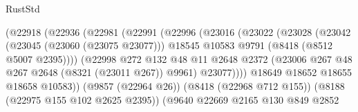 \begin{lexlean}{RustStd}
\begin{coremodule}
                                        (@22918
                                          (@22936
                                            (@22981
                                              (@22991
                                                (@22996
                                                  (@23016
                                                    (@23022
                                                      (@23028
                                                        (@23042
                                                          (@23045 (@23060 (@23075 @23077)))
                                                          @18545
                                                          @10583
                                                          @9791
                                                          (@8418 (@8512 @5007 @2395))))
                                                      (@22998
                                                        @272
                                                        @132
                                                        @48
                                                        @11
                                                        @2648
                                                        @2372
                                                        (@23006
                                                          @267
                                                          @48
                                                          @267
                                                          @2648
                                                          (@8321 (@23011 @267))
                                                          @9961)
                                                        @23077))))
                                                @18649
                                                @18652
                                                @18655
                                                @18658
                                                @10583))
                                            (@9857 (@22964 @26))
                                            (@8418 (@22968 @712 @155))
                                            (@8188 (@22975 @155 @102 @2625 @2395))
                                            (@9640
                                              @22669
                                              @2165
                                              @130
                                              @849
                                              @2852

\end{coremodule}
\end{lexlean}
